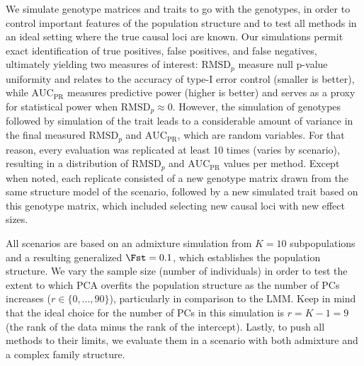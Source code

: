 \documentclass[11pt]{article}
\newcommand{\rmsd}{\text{RMSD}_p}
\newcommand{\auc}{\text{AUC}_\text{PR}}
\begin{document}
We simulate genotype matrices and traits to go with the genotypes, in order to control important features of the population structure and to test all methods in an ideal setting where the true causal loci are known.
Our simulations permit exact identification of true positives, false positives, and false negatives, ultimately yielding two measures of interest: $\rmsd$ measure null p-value uniformity and relates to the accuracy of type-I error control (smaller is better), while $\auc$ measures predictive power (higher is better) and serves as a proxy for statistical power when $\rmsd \approx 0$.
However, the simulation of genotypes followed by simulation of the trait leads to a considerable amount of variance in the final measured $\rmsd$ and $\auc$, which are random variables.
For that reason, every evaluation was replicated at least 10 times (varies by scenario), resulting in a distribution of $\rmsd$ and $\auc$ values per method.
Except when noted, each replicate consisted of a new genotype matrix drawn from the same structure model of the scenario, followed by a new simulated trait based on this genotype matrix, which included selecting new causal loci with new effect sizes.

All scenarios are based on an admixture simulation from $K=10$ subpopulations and a resulting generalized $\Fst = 0.1$, which establishes the population structure.
We vary the sample size (number of individuals) in order to test the extent to which PCA overfits the population structure as the number of PCs increases ($r \in \{0, ..., 90\}$), particularly in comparison to the LMM.
Keep in mind that the ideal choice for the number of PCs in this simulation is $r = K-1 = 9$ (the rank of the data minus the rank of the intercept).
Lastly, to push all methods to their limits, we evaluate them in a scenario with both admixture and a complex family structure.

\end{document}
